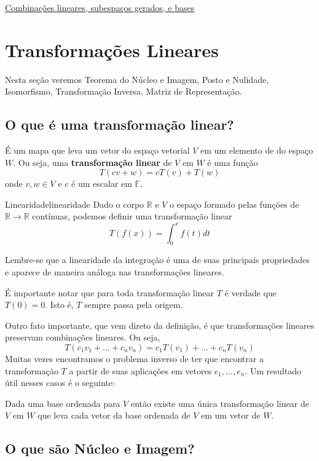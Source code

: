 \documentclass[12pt,a4paper]{article}
\begin{document}
\href{https://www.youtube.com/watch?v=k7RM-ot2NWY&list=PLZHQObOWTQDPD3MizzM2xVFitgF8hE_ab&index=2}{Combinações lineares, subespaços gerados, e bases}

\newpage
\section{Transformações Lineares}

Nesta seção veremos Teorema do Núcleo e Imagem, Posto e Nulidade, Isomorfismo, Transformação Inversa, Matriz de Representação.

\subsection{O que é uma transformação linear?}

É um mapa que leva um vetor do espaço vetorial $V$ em um elemento de do espaço $W$. Ou seja, uma \textbf{transformação linear} de $V$ em $W$ é uma função
$$
T(cv+w) = cT(v)+T(w)
$$
onde $v, w \in V$ e $c$ é um escalar em $\mathbb{F}$.

\begin{exemplo}{Linearidade}{linearidade}
Dado o corpo $\mathbb{R}$ e $V$ o espaço formado pelas funções de $\mathbb{R} \to \mathbb{R}$ contínuas, podemos definir uma transformação linear \[T(f(x)) = \int_0^x f(t)dt\]
\end{exemplo}

Lembre-se que a linearidade da integração é uma de suas principais propriedades e aparece de maneira análoga nas transformações lineares.

É importante notar que para toda transformação linear $T$ é verdade que $T(0) = 0$. Isto é, $T$ sempre passa pela origem.

Outro fato importante, que vem direto da definição, é que transformações lineares preservam combinações lineares. Ou seja,
$$
T(c_1v_1+\ldots+c_nv_n)=c_1T(v_1)+\ldots+c_nT(v_n)
$$
Muitas vezes encontramos o problema inverso de ter que encontrar a transformação $T$ a partir de suas aplicações em vetores $e_1, \ldots, e_n$. Um resultado útil nesses casos é o seguinte:

Dada uma base ordenada para $V$ então existe uma única transformação linear de $V$ em $W$ que leva cada vetor da base ordenada de $V$ em um vetor de $W$.

\subsection{O que são Núcleo e Imagem?}
\end{document}
